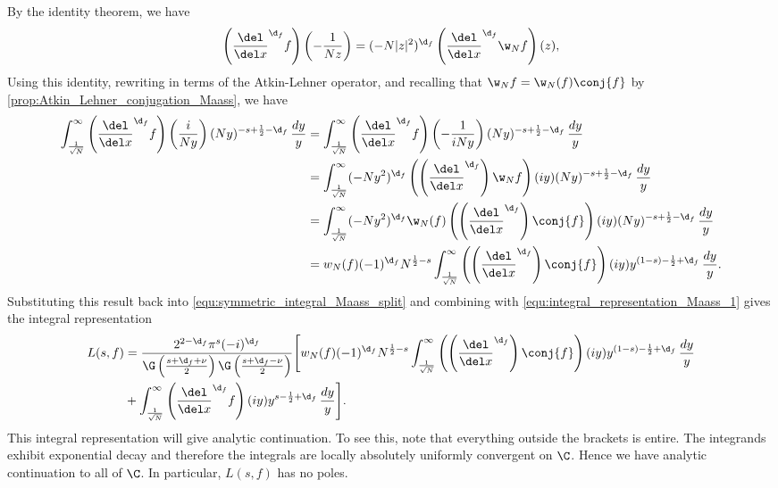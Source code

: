       By the identity theorem, we have
      \[
        \left(\frac{\del}{\del x}^{\d_{f}}f\right)\left(-\frac{1}{Nz}\right) = (-N|z|^{2})^{\d_{f}}\left(\frac{\del}{\del x}^{\d_{f}}\w_{N}f\right)(z),
      \]
      Using this identity, rewriting in terms of the Atkin-Lehner operator, and recalling that $\w_{N}f = \w_{N}(f)\conj{f}$ by \cref{prop:Atkin_Lehner_conjugation_Maass}, we have
      \begin{align*}
        \int_{\frac{1}{\sqrt{N}}}^{\infty}\left(\frac{\del}{\del x}^{\d_{f}}f\right)\left(\frac{i}{Ny}\right)(Ny)^{-s+\frac{1}{2}-\d_{f}}\,\frac{dy}{y} &= \int_{\frac{1}{\sqrt{N}}}^{\infty}\left(\frac{\del}{\del x}^{\d_{f}}f\right)\left(-\frac{1}{iNy}\right)(Ny)^{-s+\frac{1}{2}-\d_{f}}\,\frac{dy}{y} \\
        &= \int_{\frac{1}{\sqrt{N}}}^{\infty}(-Ny^{2})^{\d_{f}}\left(\left(\frac{\del}{\del x}^{\d_{f}}\right)\w_{N}f\right)(iy)(Ny)^{-s+\frac{1}{2}-\d_{f}}\,\frac{dy}{y} \\
        &= \int_{\frac{1}{\sqrt{N}}}^{\infty}(-Ny^{2})^{\d_{f}}\w_{N}(f)\left(\left(\frac{\del}{\del x}^{\d_{f}}\right)\conj{f}\right)(iy)(Ny)^{-s+\frac{1}{2}-\d_{f}}\,\frac{dy}{y} \\
        &= w_{N}(f)(-1)^{\d_{f}}N^{\frac{1}{2}-s}\int_{\frac{1}{\sqrt{N}}}^{\infty}\left(\left(\frac{\del}{\del x}^{\d_{f}}\right)\conj{f}\right)(iy)y^{(1-s)-\frac{1}{2}+\d_{f}}\,\frac{dy}{y}.
      \end{align*}
      Substituting this result back into \cref{equ:symmetric_integral_Maass_split} and combining with \cref{equ:integral_representation_Maass_1} gives the integral representation
      \begin{equation}\label{equ:integral_representation_Maass_final}
        \begin{aligned}
          L(s,f) &= \frac{2^{2-\d_{f}}\pi^{s}(-i)^{\d_{f}}}{\G\left(\frac{s+\d_{f}+\nu}{2}\right)\G\left(\frac{s+\d_{f}-\nu}{2}\right)}\Bigg[w_{N}(f)(-1)^{\d_{f}}N^{\frac{1}{2}-s}\int_{\frac{1}{\sqrt{N}}}^{\infty}\left(\left(\frac{\del}{\del x}^{\d_{f}}\right)\conj{f}\right)(iy)y^{(1-s)-\frac{1}{2}+\d_{f}}\,\frac{dy}{y} \\
          &+ \int_{\frac{1}{\sqrt{N}}}^{\infty}\left(\frac{\del}{\del x}^{\d_{f}}f\right)(iy)y^{s-\frac{1}{2}+\d_{f}}\,\frac{dy}{y}\Bigg].
        \end{aligned}
      \end{equation}
      This integral representation will give analytic continuation. To see this, note that everything outside the brackets is entire. The integrands exhibit exponential decay and therefore the integrals are locally absolutely uniformly convergent on $\C$. Hence we have analytic continuation to all of $\C$. In particular, $L(s,f)$ has no poles.
